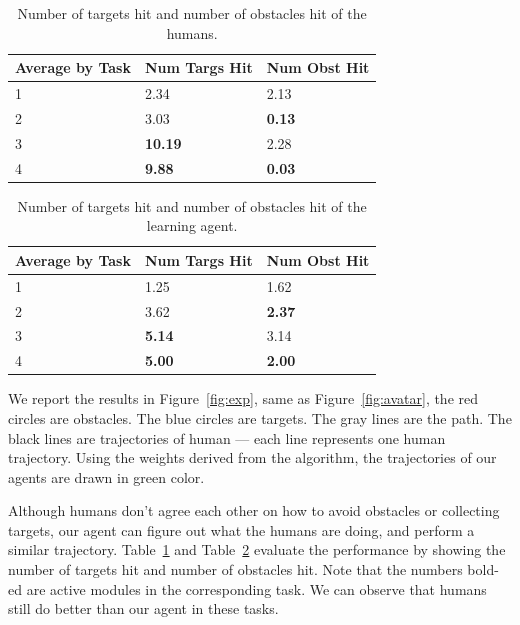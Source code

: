 \documentclass[11pt]{article} %
\begin{document}
\begin{table}[h!]
\centering
\begin{tabular}{| l| l| l |}
\hline
Average by Task & Num Targs Hit & Num Obst Hit\\
\hline
1 & 2.34 &  2.13\\
\hline
2 & 3.03 &  \bf{0.13}\\
\hline
3 & \bf{10.19} & 2.28\\
\hline
4 & \bf{9.88} &  \bf{0.03}\\
\hline
\end{tabular}
\caption{Number of targets hit and number of obstacles hit of the humans.}
\label{tb:human}
\end{table}

\begin{table}[h!]
\centering
\begin{tabular}{| l| l| l |}
\hline
Average by Task & Num Targs Hit & Num Obst Hit\\
\hline
1 & 1.25 & 1.62\\
\hline
2 & 3.62 & \bf{2.37}\\
\hline
3 & \bf{5.14} & 3.14\\
\hline
4 & \bf{5.00} & \bf{2.00}\\
\hline
\end{tabular}
\caption{Number of targets hit and number of obstacles hit of the learning agent.}
\label{tb:agent}
\end{table}

We report the results in Figure~\ref{fig:exp}, same as Figure~\ref{fig:avatar},
the red circles are obstacles. The blue circles are targets. The gray lines are
the path. The black lines are trajectories of human --- each line represents one
human trajectory.
Using the weights derived from the algorithm, the trajectories of our agents are
drawn in green color.

Although humans don't agree each other on how to avoid obstacles or collecting
targets, our agent can figure out what the humans are doing, and perform a
similar trajectory. Table~\ref{tb:human} and Table~\ref{tb:agent} evaluate the
performance by showing the number of targets hit and number of obstacles hit.
Note that the numbers bold-ed are active modules in the corresponding task. We
can observe that humans still do better than our agent in these tasks.
\end{document}

